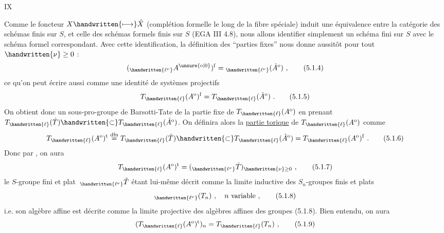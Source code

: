 \hfill IX

Comme le foncteur $X\handwritten{\longmapsto}\hat X$ (complétion formelle le long de la fibre spéciale) induit une équivalence entre la catégorie des schémas finis sur $S$, et celle des schémas formels finis sur $S$ (EGA III 4.8), nous allons identifier simplement un schéma fini sur $S$ avec le schéma formel correspondant. Avec cette identification, la définition des ``parties fixes'' nous donne aussitôt pour tout $\handwritten{\nu}\geq 0$ :
\[
({}_{\handwritten{\ell^{\nu}}}A^{\unsure{\mathrm{o}|0}})^{\mathrm f}={}_{\handwritten{\ell^{\nu}}}(\hat A^{\mathrm o})\ ,\tag*{(5.1.4)}
\]
ce qu'on peut écrire aussi comme une identité de systèmes projectifs
\[
T_{\handwritten{\ell}}(A^{\mathrm o})^{\mathrm f}=T_{\handwritten{\ell}}(\hat A^{\mathrm o})\ .\tag*{(5.1.5)}
\]
On obtient donc un sous-pro-groupe de Barsotti-Tate de la partie fixe de $T_{\handwritten{\ell}}(A^{\mathrm o})$ en prenant $T_{\handwritten{\ell}}(\hat T)\handwritten{\subset}T_{\handwritten{\ell}}(\hat A^{\mathrm o})$. On définira alors la \uline{partie torique} de $T_{\handwritten{\ell}}(A^{\mathrm o})$ comme
\[
T_{\handwritten{\ell}}(A^{\mathrm o})^{\mathrm t}\overset{\mathrm{dfn}}{=}T_{\handwritten{\ell}}(\hat T)\handwritten{\subset}T_{\handwritten{\ell}}(\hat A^{\mathrm o})=T_{\handwritten{\ell}}(A^{\mathrm o})^{\mathrm f}\ .\tag*{(5.1.6)}
\]
Donc par , on aura
\[
T_{\handwritten{\ell}}(A^{\mathrm o})^{\mathrm t}=({}_{\handwritten{\ell^{\nu}}}\hat T)_{\handwritten{\nu}\geq 0}\ ,\tag*{(5.1.7)}
\]
le $S$-groupe fini et plat $\,{}_{\handwritten{\ell^{\nu}}}\hat T$ étant lui-même décrit comme la limite inductive des $S_n$-groupes finis et plats
\[
{}_{\handwritten{\ell^{\nu}}}(T_n)\ ,\quad n\ \text{variable}\ ,\tag*{(5.1.8)}
\]
i.e. son algèbre affine est décrite comme la limite projective des algèbres affines des groupes (5.1.8). Bien entendu, on aura
\[
(T_{\handwritten{\ell}}(A^{\mathrm o})^{\mathrm t})_n=T_{\handwritten{\ell}}(T_n)\ ,\tag*{(5.1.9)}
\]
